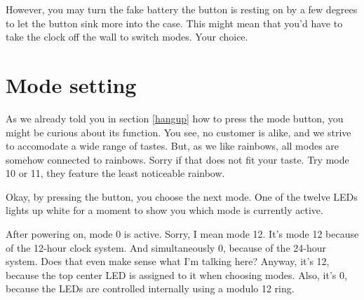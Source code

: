 \documentclass[a4paper,10pt,twocolumn]{article}
\begin{document}
However, you may turn the fake battery the button is 
resting on by a few degrees to let the button sink more into the case. This might mean that 
you'd have to take the clock off the wall to switch modes. Your choice.

\section{Mode setting}
\label{mode}

As we already told you in section \ref{hangup} how to press the mode button, you might be 
curious about its function. You see, no customer is alike, and we strive to accomodate a
wide range of tastes. But, as we like rainbows, all modes are somehow connected to rainbows.
Sorry if that does not fit your taste. Try mode 10 or 11, they feature the least noticeable 
rainbow.

Okay, by pressing the button, you choose the next mode. One of the twelve LEDs lights up white
for a moment to show you which mode is currently active.

After powering on, mode 0 is active. Sorry, I mean mode 12. It's mode 12 because of the 
12-hour clock system. And simultaneously 0, because of the 24-hour system. 
Does that even make sense what I'm talking here? Anyway, it's 12, because the top center 
LED is assigned to it when choosing modes. Also, it's 0, because the LEDs are controlled
internally using a modulo 12 ring.
\end{document}
